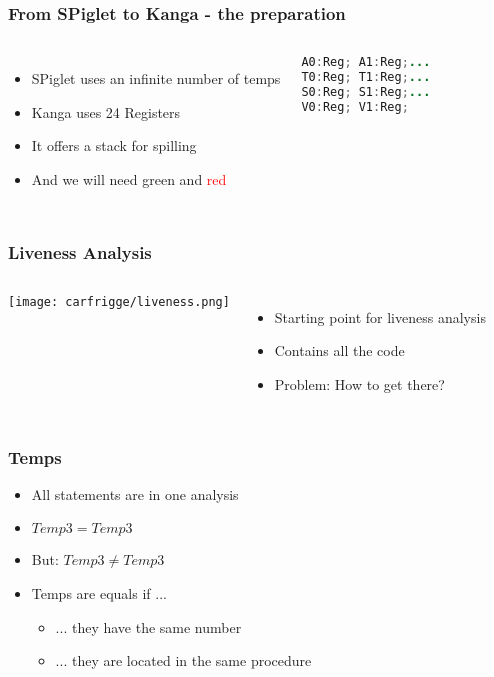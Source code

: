 \begin{frame}[fragile]
    \frametitle{From SPiglet to Kanga - the preparation}
	
    \begin{columns} 
        \begin{itemize} 
          \item SPiglet uses an infinite number of temps
          \item Kanga uses 24 Registers
	\item It offers a stack for spilling
          \item And we will need \textcolor{myGreen}{green} and \textcolor{red}{red}
        \end{itemize} 
\begin{lstlisting}[language=Java]
A0:Reg; A1:Reg;...
T0:Reg; T1:Reg;...
S0:Reg; S1:Reg;...
V0:Reg; V1:Reg;
\end{lstlisting}
    \end{columns} 
\end{frame}

\begin{frame}
    \frametitle{Liveness Analysis}
	\begin{columns} 
        \texttt{[image: carfrigge/liveness.png]} 
        \begin{itemize} 
          \item Starting point for liveness analysis 
          \item Contains all the code 
           \item Problem: How to get there?
        \end{itemize} 
    \end{columns}
\end{frame}

\begin{frame}
    \frametitle{Temps}
        \begin{itemize} 
         \item All statements are in one analysis
         \item \(Temp3 = Temp3 \)
          \item But: \(Temp3 \ne Temp3 \)
	\onslide<3-> \item Temps are equals if ...
	\begin{itemize}
		 \item ... they have the same number
		\onslide<3-> \item ... they are located in the same procedure
	\end{itemize}
        \end{itemize} 
\end{frame}

